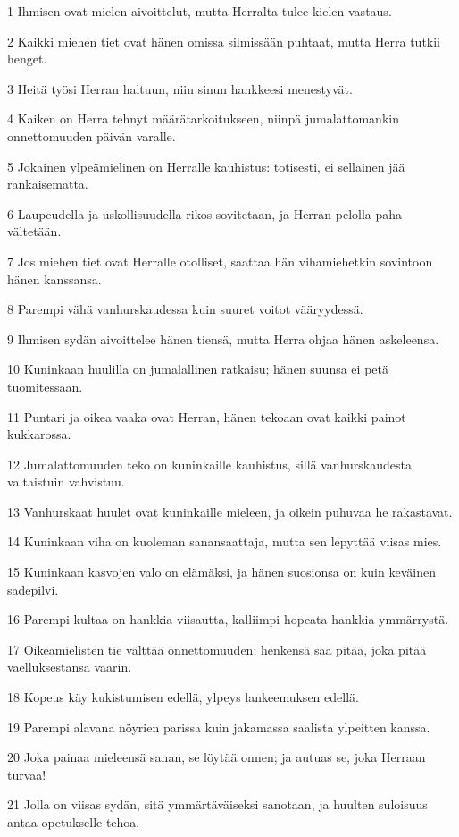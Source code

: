 \par 1 Ihmisen ovat mielen aivoittelut, mutta Herralta tulee kielen vastaus.
\par 2 Kaikki miehen tiet ovat hänen omissa silmissään puhtaat, mutta Herra tutkii henget.
\par 3 Heitä työsi Herran haltuun, niin sinun hankkeesi menestyvät.
\par 4 Kaiken on Herra tehnyt määrätarkoitukseen, niinpä jumalattomankin onnettomuuden päivän varalle.
\par 5 Jokainen ylpeämielinen on Herralle kauhistus: totisesti, ei sellainen jää rankaisematta.
\par 6 Laupeudella ja uskollisuudella rikos sovitetaan, ja Herran pelolla paha vältetään.
\par 7 Jos miehen tiet ovat Herralle otolliset, saattaa hän vihamiehetkin sovintoon hänen kanssansa.
\par 8 Parempi vähä vanhurskaudessa kuin suuret voitot vääryydessä.
\par 9 Ihmisen sydän aivoittelee hänen tiensä, mutta Herra ohjaa hänen askeleensa.
\par 10 Kuninkaan huulilla on jumalallinen ratkaisu; hänen suunsa ei petä tuomitessaan.
\par 11 Puntari ja oikea vaaka ovat Herran, hänen tekoaan ovat kaikki painot kukkarossa.
\par 12 Jumalattomuuden teko on kuninkaille kauhistus, sillä vanhurskaudesta valtaistuin vahvistuu.
\par 13 Vanhurskaat huulet ovat kuninkaille mieleen, ja oikein puhuvaa he rakastavat.
\par 14 Kuninkaan viha on kuoleman sanansaattaja, mutta sen lepyttää viisas mies.
\par 15 Kuninkaan kasvojen valo on elämäksi, ja hänen suosionsa on kuin keväinen sadepilvi.
\par 16 Parempi kultaa on hankkia viisautta, kalliimpi hopeata hankkia ymmärrystä.
\par 17 Oikeamielisten tie välttää onnettomuuden; henkensä saa pitää, joka pitää vaelluksestansa vaarin.
\par 18 Kopeus käy kukistumisen edellä, ylpeys lankeemuksen edellä.
\par 19 Parempi alavana nöyrien parissa kuin jakamassa saalista ylpeitten kanssa.
\par 20 Joka painaa mieleensä sanan, se löytää onnen; ja autuas se, joka Herraan turvaa!
\par 21 Jolla on viisas sydän, sitä ymmärtäväiseksi sanotaan, ja huulten suloisuus antaa opetukselle tehoa.
